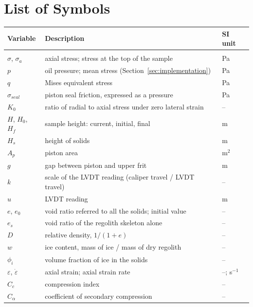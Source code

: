 \documentclass{Configuration_Files/PoliMi3i_thesis}
\begin{document}
\chapter*{List of Symbols} %
\begin{table}[H]
    \centering
    \begin{tabular}{lll}
        \textbf{Variable} & \textbf{Description} & \textbf{SI unit} \\\hline\\[-9px]
        $\sigma$, $\sigma_a$ & axial stress; stress at the top of the sample & Pa \\[2px]
        $p$ & oil pressure; mean stress (Section~\ref{sec:implementation}) & Pa \\[2px]
        $q$ & Mises equivalent stress & Pa \\[2px]
        $\sigma_{seal}$ & piston seal friction, expressed as a pressure & Pa \\[2px]
        $K_0$ & ratio of radial to axial stress under zero lateral strain & -- \\[2px]
        $H$, $H_0$, $H_f$ & sample height: current, initial, final & m \\[2px]
        $H_s$ & height of solids & m \\[2px]
        $A_p$ & piston area & m$^2$ \\[2px]
        $g$ & gap between piston and upper frit & m \\[2px]
        $k$ & scale of the LVDT reading (caliper travel / LVDT travel) & -- \\[2px]
        $u$ & LVDT reading & m \\[2px]
        $e$, $e_0$ & void ratio referred to all the solids; initial value & -- \\[2px]
        $e_s$ & void ratio of the regolith skeleton alone & -- \\[2px]
        $D$ & relative density, $1/(1+e)$ & -- \\[2px]
        $w$ & ice content, mass of ice / mass of dry regolith & -- \\[2px]
        $\phi_i$ & volume fraction of ice in the solids & -- \\[2px]
        $\varepsilon$, $\dot{\varepsilon}$ & axial strain; axial strain rate & --; s$^{-1}$ \\[2px]
        $C_c$ & compression index & -- \\[2px]
        $C_\alpha$ & coefficient of secondary compression & -- \\[2px]

\end{tabular}
\end{table}
\end{document}
